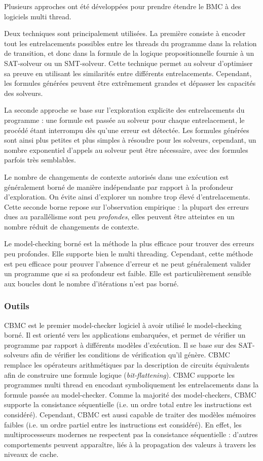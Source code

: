 Plusieurs approches ont été développées pour prendre étendre le \ac{BMC} à des
logiciels multi thread\cite{ESBMC_multithread}.

Deux techniques sont principalement utilisées.
La première consiste à encoder tout les entrelacements possibles entre les threads
du programme dans la relation de transition, et donc dans la formule de la
logique propositionnelle fournie à un SAT-solveur ou un SMT-solveur. Cette
technique permet au solveur d'optimiser sa preuve en utilisant les similarités
entre différents entrelacements. Cependant, les formules générées peuvent être
extrêmement grandes et dépasser les capacités des solveurs.

La seconde approche se base sur l'exploration explicite des entrelacements du
programme : une formule est passée au solveur pour chaque entrelacement, le
procédé étant interrompu dès qu'une erreur est détectée. Les formules générées
sont ainsi plus petites et plus simples à résoudre pour les solveurs, cependant,
un nombre exponentiel d'appels au solveur peut être nécessaire, avec des
formules parfois très semblables.

Le nombre de changements de contexte autorisés dans une exécution est
généralement borné de manière indépendante par rapport à la profondeur
d'exploration. On évite ainsi d'explorer un nombre trop élevé d'entrelacements.
Cette seconde borne repose sur l'observation empirique : la plupart des erreurs
dues au parallélisme sont peu \emph{profondes}, elles peuvent être atteintes en
un nombre réduit de changements de contexte.

Le model-checking borné est la méthode la plus efficace pour trouver des
erreurs peu profondes. Elle supporte bien le multi threading. Cependant,
cette méthode est peu efficace pour prouver l'absence d'erreur et ne
peut généralement valider un programme que si sa profondeur est faible.
Elle est particulièrement sensible aux boucles dont le nombre
d'itérations n'est pas borné.

\subsubsection{Outils}

CBMC\cite{CBMC} est le premier model-checker logiciel à avoir utilisé le
model-checking borné. Il est orienté vers les applications embarquées, et permet
de vérifier un programme par rapport à différents modèles d'exécution. Il se
base sur des SAT-solveurs afin de vérifier les conditions de vérification qu'il
génère. CBMC remplace les opérateurs arithmétiques par la description de
circuits équivalents afin de construire une formule logique
(\emph{bit-flattening}). CBMC supporte les programmes multi thread en encodant
symboliquement les entrelacements dans la formule passée au model-checker. Comme
la majorité des model-checkers, CBMC supporte la consistance séquentielle (i.e.
un ordre total entre les instructions est considéré). Cependant, CBMC est aussi
capable de traiter des modèles mémoires faibles (i.e. un ordre partiel entre les
instructions est considéré). En effet, les multiprocesseurs modernes ne
respectent pas la consistance séquentielle : d'autres comportements peuvent
apparaître, liés à la propagation des valeurs à travers les niveaux de cache.

